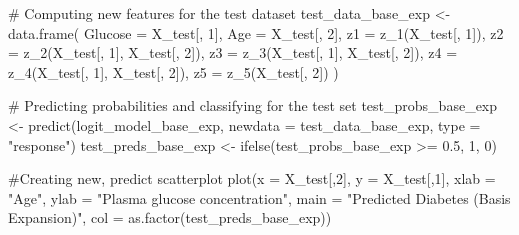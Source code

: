 \documentclass[
]{article}
\newenvironment{Shaded}{\begin{snugshade}}{\end{snugshade}}
\newcommand{\NormalTok}[1]{#1}
\begin{document}
\begin{Shaded}
\begin{Highlighting}[]
\NormalTok{\# Computing new features for the test dataset}
\NormalTok{test\_data\_base\_exp \textless{}{-} data.frame(}
\NormalTok{  Glucose = X\_test[, 1],}
\NormalTok{  Age = X\_test[, 2],}
\NormalTok{  z1 = z\_1(X\_test[, 1]),}
\NormalTok{  z2 = z\_2(X\_test[, 1], X\_test[, 2]),}
\NormalTok{  z3 = z\_3(X\_test[, 1], X\_test[, 2]),}
\NormalTok{  z4 = z\_4(X\_test[, 1], X\_test[, 2]),}
\NormalTok{  z5 = z\_5(X\_test[, 2])}
\NormalTok{)}

\NormalTok{\# Predicting probabilities and classifying for the test set}
\NormalTok{test\_probs\_base\_exp \textless{}{-} predict(logit\_model\_base\_exp, newdata = test\_data\_base\_exp, type = "response")}
\NormalTok{test\_preds\_base\_exp \textless{}{-} ifelse(test\_probs\_base\_exp \textgreater{}= 0.5, 1, 0)}

\NormalTok{\#Creating new, predict scatterplot}
\NormalTok{plot(x = X\_test[,2], }
\NormalTok{     y = X\_test[,1],}
\NormalTok{     xlab = "Age",}
\NormalTok{     ylab = "Plasma glucose concentration",}
\NormalTok{     main = "Predicted Diabetes (Basis Expansion)",}
\NormalTok{     col = as.factor(test\_preds\_base\_exp))}
\end{Highlighting}
\end{Shaded}
\end{document}
